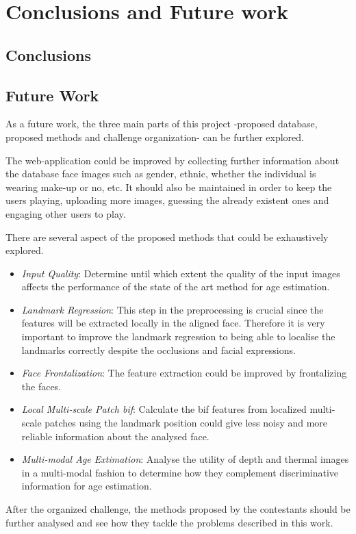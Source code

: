 \chapter{Conclusions and Future work} \label{chap:conclusions}

\section{Conclusions}



\section{Future Work}

As a future work, the three main parts of this project -proposed database, proposed methods and challenge organization- can be further explored.

The web-application could be improved by collecting further information about the database face images such as gender, ethnic, whether the individual is wearing make-up or no, etc. It should also be maintained in order to keep the users playing, uploading more images, guessing the already existent ones and engaging other users to play.

There are several aspect of the proposed methods that could be exhaustively explored.

\begin{itemize}
	\item \textit{Input Quality}: Determine until which extent the quality of the input images affects the performance of the state of the art method for age estimation.
	
	\item \textit{Landmark Regression}: This step in the preprocessing is crucial since the features will be extracted locally in the aligned face. Therefore it is very important to improve the landmark regression to being able to localise the landmarks correctly despite the occlusions and facial expressions.
	
	\item \textit{Face Frontalization}: The feature extraction could be improved by frontalizing the faces.
	
	\item \textit{Local Multi-scale Patch \gls{bif}}: Calculate the \gls{bif} features from localized multi-scale patches using the landmark position could give less noisy and more reliable information about the analysed face.
	
	\item \textit{Multi-modal Age Extimation}: Analyse the utility of depth and thermal images in a multi-modal fashion to determine how they complement discriminative information for age estimation.
\end{itemize}

After the organized challenge, the methods proposed by the contestants should be further analysed and see how they tackle the problems described in this work.


